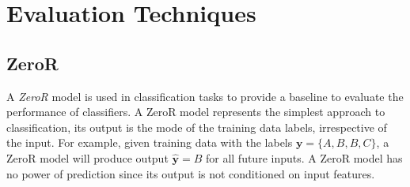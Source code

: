







\section{Evaluation Techniques}
\label{sec:evaluation-techniques}


\subsection{ZeroR}

A \emph{ZeroR} model is used in classification tasks to provide a baseline to evaluate the performance of classifiers. A ZeroR model represents the simplest approach to classification, its output is the mode of the training data labels, irrespective of the input. For example, given training data with the labels $\bm{y} = \{ A, B, B, C\}$, a ZeroR model will produce output $\bm{\hat{y}} = B$ for all future inputs. A ZeroR model has no power of prediction since its output is not conditioned on input features.


